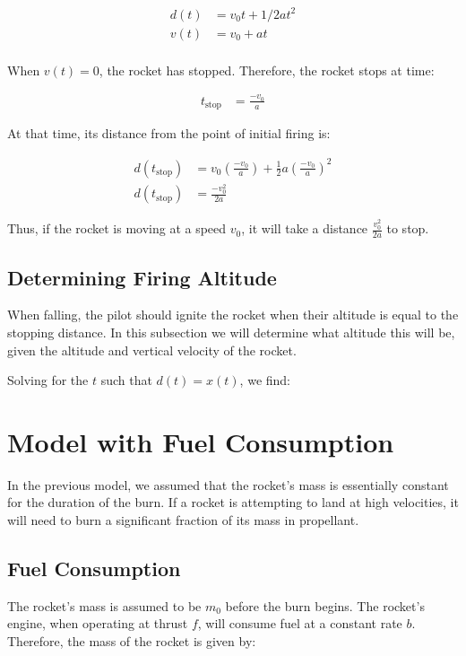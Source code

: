 \documentclass{article}
\begin{document}
\begin{align*}
	d(t) & = v_0 t + 1 / 2 a t^2 \\
	v(t) & = v_0 + a t \\
\end{align*}

When $v(t) = 0$, the rocket has stopped.
Therefore, the rocket stops at time:

\begin{align*}
	t_\text{stop} & = \frac {-v_0} a
\end{align*}

At that time, its distance from the point of initial firing is:

\begin{align*}
	d(t_\text{stop}) & = 
	v_0 \left( \frac {- v_0} a \right)
	+ \frac 1 2 a \left( \frac {-v_0} a \right)^2\\
	d(t_\text{stop})
	& = \frac {- v_0^2}	{2 a}
\end{align*}

Thus, if the rocket is moving at a speed $v_0$,
	it will take a distance $\frac {v_0^2} {2 a}$ to stop.

\subsection{Determining Firing Altitude}

When falling, the pilot should ignite the rocket when their altitude
	is equal to the stopping distance.
In this subsection we will determine what altitude this will be,
	given the altitude and vertical velocity of the rocket.

Solving for the $t$ such that $d(t) = x(t)$,
	we find:

\section{Model with Fuel Consumption}

In the previous model, we assumed that the rocket's mass is essentially
	constant for the duration of the burn.
If a rocket is attempting to land at high velocities, it will need to
	burn a significant fraction of its mass in propellant.

\subsection{Fuel Consumption}

The rocket's mass is assumed to be $m_0$ before the burn begins.
The rocket's engine, when operating at thrust $f$, will consume fuel
	at a constant rate $b$.
Therefore, the mass of the rocket is given by:
\end{document}
